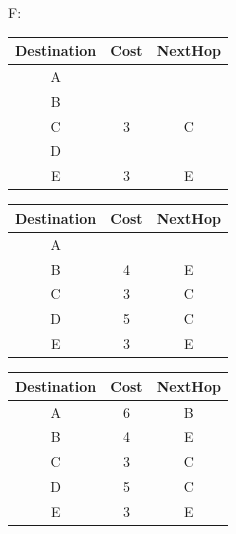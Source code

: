 \documentclass[12pt]{article}
\begin{document}
F:\\
\begin{tabular}{|c|c|c|}
	\hline
	Destination & Cost & NextHop \\\hline
	\hline
	A           &      &         \\\hline
	B           &      &         \\\hline
	C           & 3    & C       \\\hline
	D           &      &         \\\hline
	E           & 3    & E       \\\hline
\end{tabular}
\begin{tabular}{|c|c|c|}
	\hline
	Destination & Cost & NextHop \\\hline
	\hline
	A           &      &         \\\hline
	B           & 4    & E       \\\hline
	C           & 3    & C       \\\hline
	D           & 5    & C       \\\hline
	E           & 3    & E       \\\hline
\end{tabular}
\begin{tabular}{|c|c|c|}
	\hline
	Destination & Cost & NextHop \\\hline
	\hline
	A           & 6    & B       \\\hline
	B           & 4    & E       \\\hline
	C           & 3    & C       \\\hline
	D           & 5    & C       \\\hline
	E           & 3    & E       \\\hline
\end{tabular}\\[3mm]
\end{document}
